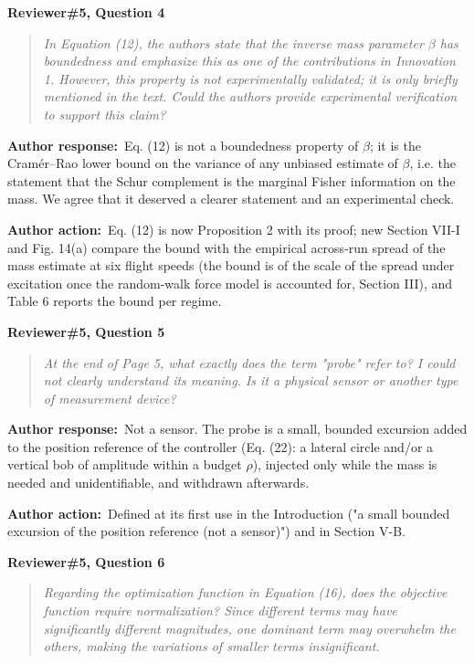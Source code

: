 \documentclass[11pt]{article}
\newcommand{\concern}[1]{\par\medskip\noindent\colorbox{gray!12}{\parbox{\dimexpr\linewidth-2\fboxsep}{\textbf{#1}}}\par\smallskip}
\newcommand{\rlabel}[1]{\par\textbf{#1}\ }
\begin{document}
\concern{Reviewer\#5, Question 4}

\begin{quote}\itshape In Equation (12), the authors state that the inverse mass parameter $\beta$ has boundedness and emphasize this as one of the contributions in Innovation 1. However, this property is not experimentally validated; it is only briefly mentioned in the text. Could the authors provide experimental verification to support this claim?\end{quote}

\rlabel{Author response:}Eq. (12) is not a boundedness property of $\beta$; it is the Cram\'er--Rao lower bound on the variance of any unbiased estimate of $\beta$, i.e. the statement that the Schur complement is the marginal Fisher information on the mass. We agree that it deserved a clearer statement and an experimental check.

\rlabel{Author action:}Eq. (12) is now Proposition 2 with its proof; new Section VII-I and Fig. 14(a) compare the bound with the empirical across-run spread of the mass estimate at six flight speeds (the bound is of the scale of the spread under excitation once the random-walk force model is accounted for, Section III), and Table 6 reports the bound per regime.

\concern{Reviewer\#5, Question 5}

\begin{quote}\itshape At the end of Page 5, what exactly does the term "probe" refer to? I could not clearly understand its meaning. Is it a physical sensor or another type of measurement device?\end{quote}

\rlabel{Author response:}Not a sensor. The probe is a small, bounded excursion added to the position reference of the controller (Eq. (22): a lateral circle and/or a vertical bob of amplitude within a budget $\rho$), injected only while the mass is needed and unidentifiable, and withdrawn afterwards.

\rlabel{Author action:}Defined at its first use in the Introduction ("a small bounded excursion of the position reference (not a sensor)") and in Section V-B.

\concern{Reviewer\#5, Question 6}

\begin{quote}\itshape Regarding the optimization function in Equation (16), does the objective function require normalization? Since different terms may have significantly different magnitudes, one dominant term may overwhelm the others, making the variations of smaller terms insignificant.\end{quote}
\end{document}
